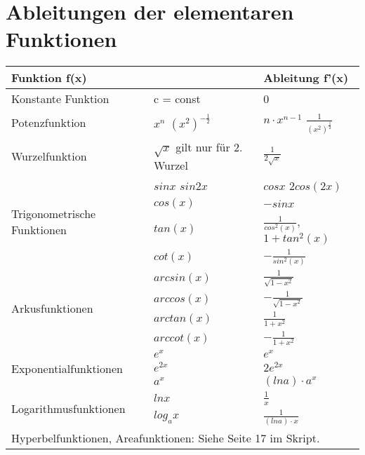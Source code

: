 \section{Ableitungen der elementaren Funktionen}

\begin{longtable}{|l|l|l|}
	\hline
	\multicolumn{2}{|l|}{Funktion f(x)}  & Ableitung f'(x) \\
	\hline
	Konstante Funktion & c = const & 0 \\
	\hline
	Potenzfunktion & \(x^n\) \newline \((x^2)^{-\frac{1}{2}} \) & \(n \cdot x^{n-1}\) \newline \(\frac{1}{(x^{2})^{\frac{1}{2}}}\) \\
	\hline
	Wurzelfunktion & \(\sqrt{x}\) gilt nur für 2. Wurzel & \(\frac{1}{2 \sqrt{x}}\) \\
	\hline
	\multirow{4}{*}{Trigonometrische Funktionen} & \(sin x\) \newline \(sin 2x\) & \(cos x\) \newline \(2 cos (2x)\) \\ \cline{2-3}
	& \(cos(x)\)  & \(-sin x\) \\ \cline{2-3}
	& \(tan(x)\) & \(\frac{1}{cos^2(x)}\), \( 1 + tan^2(x) \) \\ \cline{2-3}
	& \(cot(x)\) & \(-\frac{1}{sin^2(x)}\) \\
	\hline
	\multirow{4}{*}{Arkusfunktionen} & \(arcsin(x)\) & \(\frac{1}{\sqrt{1 - x^2}} \) \\ \cline{2-3}
	& \(arccos(x)\) & \(-\frac{1}{\sqrt{1-x^2}}\) \\ \cline{2-3}
	& \(arctan(x)\) & \(\frac{1}{1+x^2}\) \\ \cline{2-3}
	& \(arccot(x)\) & \(-\frac{1}{1+x^2}\) \\
	\hline
	\multirow{3}{*}{Exponentialfunktionen} & \(e^x\) & \( e^x \) \\ \cline{2-3}
	& \(e^{2x}\) & \( 2e^{2x} \) \\ \cline{2-3}
	& \(a^x\) & \((ln a) \cdot a^x \) \\ \hline
	\multirow{2}{*}{Logarithmusfunktionen} & \(ln x\) & \( \frac{1}{x} \) \\ \cline{2-3}
	& \(log_a x\) & \( \frac{1}{(ln a) \cdot x } \) \\ \hline
	\multicolumn{3}{|l|}{Hyperbelfunktionen, Areafunktionen: Siehe Seite 17 im Skript.} \\ \hline
\end{longtable}

